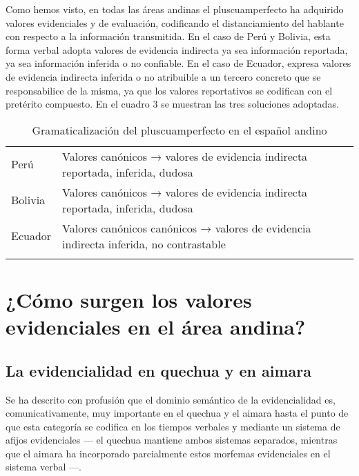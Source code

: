 \documentclass[output=paper]{../langscibook}
\begin{document}
Como hemos visto, en todas las áreas andinas el pluscuamperfecto ha adquirido valores evidenciales y de evaluación, codificando el distanciamiento del hablante con respecto a la información transmitida. En el caso de Perú y Bolivia, esta forma verbal adopta valores de evidencia indirecta ya sea información reportada, ya sea información inferida o no confiable. En el caso de Ecuador, expresa valores de evidencia indirecta inferida o no atribuible a un tercero concreto que se responsabilice de la misma, ya que los valores reportativos se codifican con el pretérito compuesto.  En el cuadro 3 se muestran las tres soluciones adoptadas.

\begin{table}
\caption{\label{tab:palacios:3} Gramaticalización del pluscuamperfecto en el español andino}
\begin{tabularx}{\textwidth}{lQ}
\lsptoprule
Perú & Valores canónicos → valores de evidencia indirecta reportada, inferida, dudosa\\
Bolivia & Valores canónicos → valores de evidencia indirecta reportada, inferida, dudosa\\
Ecuador & Valores canónicos canónicos → valores de evidencia indirecta inferida, no contrastable\\
\lspbottomrule
\end{tabularx}
\end{table}

\section{¿Cómo surgen los valores evidenciales en el área andina?}\label{sec:palacios:6}

 \subsection{La evidencialidad en quechua y en aimara}\label{sec:palacios:6.1}

Se ha descrito con profusión que el dominio semántico de la evidencialidad es, comunicativamente, muy importante en el quechua y el aimara hasta el punto de que esta categoría se codifica en los tiempos verbales y mediante un sistema de afijos evidenciales –– el quechua mantiene ambos sistemas separados, mientras que el aimara ha incorporado parcialmente estos morfemas evidenciales en el sistema verbal \citep[6]{Adelaar1997} ––.
\end{document}
